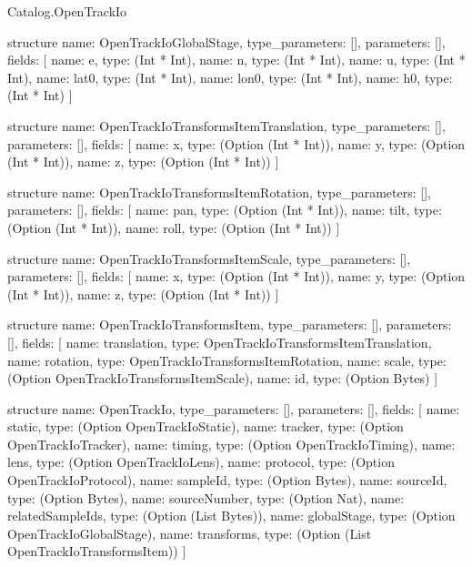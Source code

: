 \begin{lexlean}{Catalog.OpenTrackIo}
\begin{semanticmodule}
structure{
  name: OpenTrackIoGlobalStage,
  type_parameters: [],
  parameters: [],
  fields: [
    {name: e, type: (Int * Int)},
    {name: n, type: (Int * Int)},
    {name: u, type: (Int * Int)},
    {name: lat0, type: (Int * Int)},
    {name: lon0, type: (Int * Int)},
    {name: h0, type: (Int * Int)}
  ]
}

structure{
  name: OpenTrackIoTransformsItemTranslation,
  type_parameters: [],
  parameters: [],
  fields: [
    {name: x, type: (Option (Int * Int))},
    {name: y, type: (Option (Int * Int))},
    {name: z, type: (Option (Int * Int))}
  ]
}

structure{
  name: OpenTrackIoTransformsItemRotation,
  type_parameters: [],
  parameters: [],
  fields: [
    {name: pan, type: (Option (Int * Int))},
    {name: tilt, type: (Option (Int * Int))},
    {name: roll, type: (Option (Int * Int))}
  ]
}

structure{
  name: OpenTrackIoTransformsItemScale,
  type_parameters: [],
  parameters: [],
  fields: [
    {name: x, type: (Option (Int * Int))},
    {name: y, type: (Option (Int * Int))},
    {name: z, type: (Option (Int * Int))}
  ]
}

structure{
  name: OpenTrackIoTransformsItem,
  type_parameters: [],
  parameters: [],
  fields: [
    {name: translation, type: OpenTrackIoTransformsItemTranslation},
    {name: rotation, type: OpenTrackIoTransformsItemRotation},
    {name: scale, type: (Option OpenTrackIoTransformsItemScale)},
    {name: id, type: (Option Bytes)}
  ]
}

structure{
  name: OpenTrackIo,
  type_parameters: [],
  parameters: [],
  fields: [
    {name: static, type: (Option OpenTrackIoStatic)},
    {name: tracker, type: (Option OpenTrackIoTracker)},
    {name: timing, type: (Option OpenTrackIoTiming)},
    {name: lens, type: (Option OpenTrackIoLens)},
    {name: protocol, type: (Option OpenTrackIoProtocol)},
    {name: sampleId, type: (Option Bytes)},
    {name: sourceId, type: (Option Bytes)},
    {name: sourceNumber, type: (Option Nat)},
    {name: relatedSampleIds, type: (Option (List Bytes))},
    {name: globalStage, type: (Option OpenTrackIoGlobalStage)},
    {name: transforms, type: (Option (List OpenTrackIoTransformsItem))}
  ]
}
\end{semanticmodule}
\end{lexlean}
